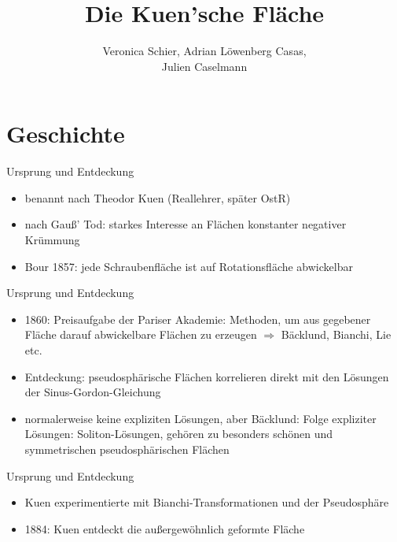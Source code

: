 \documentclass[12pt]{beamer}
\author{Veronica Schier, Adrian Löwenberg Casas, \\Julien Caselmann}
\title{Die Kuen'sche Fläche}
\begin{document}
\begin{frame}
\titlepage
\end{frame}

\begin{frame}

\tableofcontents

\end{frame}

\section{Geschichte}
\begin{frame}{Ursprung und Entdeckung}

\begin{itemize}
\item benannt nach Theodor Kuen (Reallehrer, später OstR)
\item nach Gauß' Tod: starkes Interesse an Flächen konstanter negativer Krümmung
\item Bour 1857: jede Schraubenfläche ist auf Rotationsfläche abwickelbar
\end{itemize}

\end{frame}

\begin{frame}{Ursprung und Entdeckung}

\begin{itemize}
\item 1860: Preisaufgabe der Pariser Akademie: Methoden, um aus gegebener Fläche darauf abwickelbare Flächen zu erzeugen $\Rightarrow$ Bäcklund, Bianchi, Lie etc.\cite{scriba}
\item Entdeckung: pseudosphärische Flächen korrelieren direkt mit den Lösungen der Sinus-Gordon-Gleichung 
\item normalerweise keine expliziten Lösungen, aber Bäcklund: Folge expliziter Lösungen: Soliton-Lösungen, gehören zu \glqq besonders schönen und symmetrischen pseudosphärischen Flächen\grqq \cite{bruter}
\end{itemize}

\end{frame}

\begin{frame}{Ursprung und Entdeckung}
\begin{itemize}

\item Kuen experimentierte mit Bianchi-Transformationen und der Pseudosphäre
\item 1884: Kuen entdeckt die außergewöhnlich geformte Fläche
\end{itemize}
\end{frame}
\end{document}

